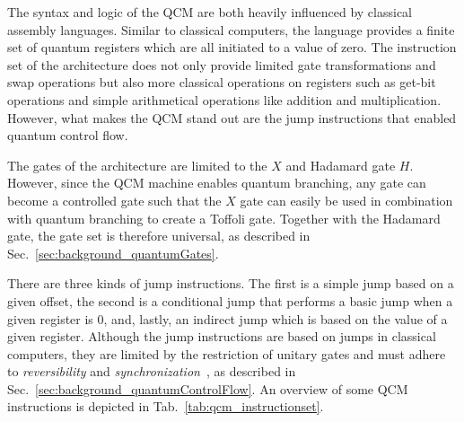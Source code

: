 The syntax and logic of the QCM are both heavily influenced by classical assembly languages. Similar to classical computers,
the language provides a finite set of quantum registers which are all initiated to a value of zero. The instruction set of the architecture does not only provide limited gate transformations and swap operations but also more classical operations on registers such as get-bit operations and simple arithmetical operations like addition and multiplication. However, what makes the QCM stand out are the jump instructions that enabled quantum control flow.

The gates of the architecture are limited to the $X$ and Hadamard gate $H$. However, since the QCM machine enables quantum branching, any gate can become a controlled gate such that the $X$ gate can easily be used in combination with quantum branching to create a Toffoli gate. Together with the Hadamard gate, the gate set is therefore universal, as described in Sec.~\ref{sec:background_quantumGates}.

There are three kinds of jump instructions. The first is a simple jump based on a given offset, the second is a conditional jump that performs a basic jump when a given register is $0$, and, lastly, an indirect jump which is based on the value of a given register. Although the jump instructions are based on jumps in classical computers, they are limited by the restriction of unitary gates and must adhere to \emph{reversibility} and \emph{synchronization}~\cite{YVC24}, as described in Sec.~\ref{sec:background_quantumControlFlow}. An overview of some QCM instructions is depicted in Tab.~\ref{tab:qcm_instructionset}.

